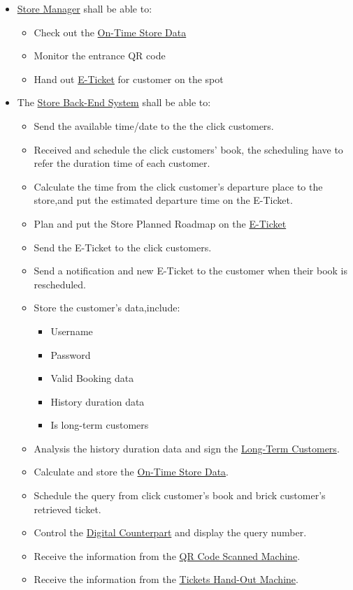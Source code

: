 \documentclass[a4paper,12pt]{book}
\begin{document}
\begin{itemize}
	\item \hyperref[Definitions]{Store Manager} shall be able to: 
	\begin{itemize}
		\item Check out the \hyperref[Definitions]{On-Time Store Data}
		\item Monitor the entrance QR code
		\item Hand out \hyperref[Definitions]{E-Ticket} for customer on the spot
	\end{itemize}

	\item The \hyperref[Definitions]{Store Back-End System} shall be able to:
	\begin{itemize}
		\item Send the available time/date to the the click customers.
		\item Received and schedule the click customers' book, the scheduling have to refer the duration time of each customer.
		\item Calculate the time from the click customer's departure place to the store,and put the estimated departure time on the E-Ticket.
		\item Plan and put the Store Planned Roadmap on the \hyperref[Definitions]{E-Ticket}
		\item Send the  E-Ticket to the click customers.
		\item Send a notification and new E-Ticket to the customer when their book is rescheduled.
		\item Store the customer's data,include:
		\begin{itemize}
			\item Username
			\item Password
			\item Valid Booking data
			\item History duration data
			\item Is long-term customers
		\end{itemize}
		\item Analysis the history duration data and sign the \hyperref[Definitions]{Long-Term Customers}.
		\item Calculate and store the \hyperref[Definitions]{On-Time Store Data}.
		\item Schedule the query from click customer's book and brick customer's retrieved ticket.
		\item Control the \hyperref[Definitions]{Digital Counterpart} and display the query number.
		\item Receive the information from the \hyperref[Definitions]{QR Code Scanned Machine}.
		\item Receive the information from the \hyperref[Definitions]{Tickets Hand-Out Machine}.
	\end{itemize}
\end{itemize}
\end{document}
